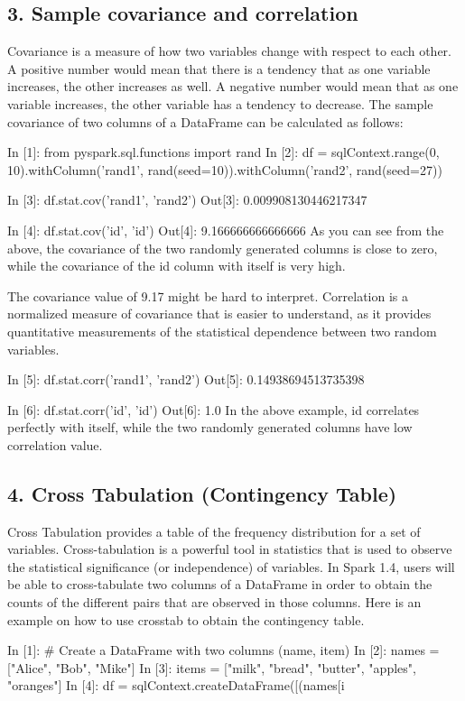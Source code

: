 \subsection*{3. Sample covariance and correlation}
Covariance is a measure of how two variables change with respect to each other. A positive number would mean that there is a tendency that as one variable increases, the other increases as well. A negative number would mean that as one variable increases, the other variable has a tendency to decrease. The sample covariance of two columns of a DataFrame can be calculated as follows:

In [1]: from pyspark.sql.functions import rand
In [2]: df = sqlContext.range(0, 10).withColumn('rand1', rand(seed=10)).withColumn('rand2', rand(seed=27))

In [3]: df.stat.cov('rand1', 'rand2')
Out[3]: 0.009908130446217347

In [4]: df.stat.cov('id', 'id')
Out[4]: 9.166666666666666
As you can see from the above, the covariance of the two randomly generated columns is close to zero, while the covariance of the id column with itself is very high.

The covariance value of 9.17 might be hard to interpret. Correlation is a normalized measure of covariance that is easier to understand, as it provides quantitative measurements of the statistical dependence between two random variables.

In [5]: df.stat.corr('rand1', 'rand2')
Out[5]: 0.14938694513735398

In [6]: df.stat.corr('id', 'id')
Out[6]: 1.0
In the above example, id correlates perfectly with itself, while the two randomly generated columns have low correlation value.

\subsection*{4. Cross Tabulation (Contingency Table)}
Cross Tabulation provides a table of the frequency distribution for a set of variables. Cross-tabulation is a powerful tool in statistics that is used to observe the statistical significance (or independence) of variables. In Spark 1.4, users will be able to cross-tabulate two columns of a DataFrame in order to obtain the counts of the different pairs that are observed in those columns. Here is an example on how to use crosstab to obtain the contingency table.

In [1]: # Create a DataFrame with two columns (name, item)
In [2]: names = ["Alice", "Bob", "Mike"]
In [3]: items = ["milk", "bread", "butter", "apples", "oranges"]
In [4]: df = sqlContext.createDataFrame([(names[i %

